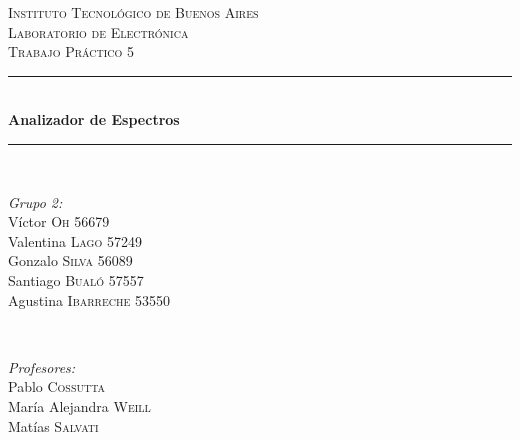 \begin{titlepage}
    \newcommand{\HRule}{\rule{\linewidth}{0.5mm}}
    \center
    \textsc{\LARGE Instituto Tecnológico de Buenos Aires}\\[1.2cm]
    \textsc{\Large Laboratorio de Electrónica}\\[0.5cm]
    \textsc{\large Trabajo Práctico 5}\\[0.5cm]
    
    \HRule \\[0.4cm]
    { \huge \bfseries Analizador de Espectros }\\[0.4cm] %
    \HRule \\[1.5cm]
    
    
    \begin{minipage}{0.4\textwidth}
    \begin{flushleft} \large
    \emph{Grupo 2:}\\
    Víctor \textsc{Oh} 56679\\
    Valentina \textsc{Lago}  57249\\
    Gonzalo \textsc{Silva} 56089\\
    Santiago \textsc{Bualó}   57557\\
    Agustina \textsc{Ibarreche} 53550\\
    \end{flushleft}
    \end{minipage}
    ~
    \begin{minipage}{0.4\textwidth}
    \begin{flushright} \large
    \emph{Profesores:} \\
    Pablo  \textsc{Cossutta}\\
    María Alejandra \textsc{Weill}\\
    Matías \textsc{Salvati}
    \end{flushright}
    \end{minipage}\\[4cm]
    
    \vfill %
\end{titlepage}